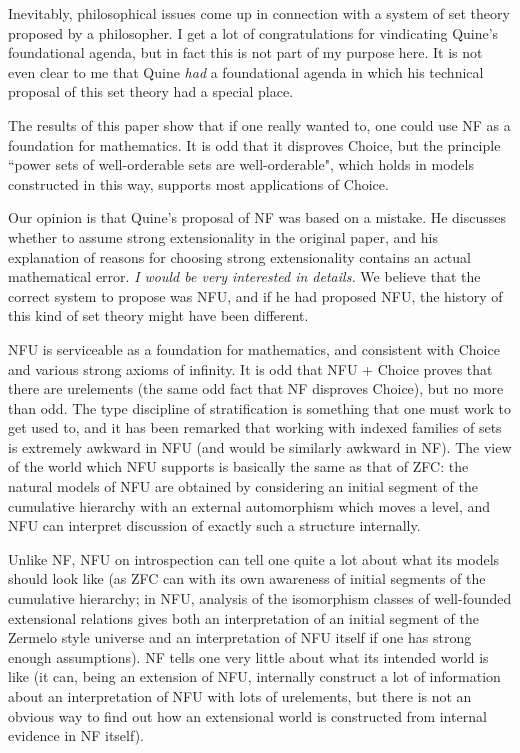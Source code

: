 \documentclass[112pt]{article}
\theoremstyle{definition}
\theoremstyle{remark}
\newcommand{\rk}[1]{{\color{blue}\sl #1}}
\newcommand{\rk}[1]{}
\begin{document}
Inevitably, philosophical issues come up in connection with a system of set theory proposed by a philosopher.  I get a lot of congratulations for vindicating Quine's foundational agenda, but in fact this is not part of my purpose here.  It is not even clear to me that Quine {\em had\/} a foundational agenda in which his technical proposal of this set theory had a special place.

The results of this paper show that if one really wanted to, one could use NF as a foundation for mathematics.  It is odd that it disproves Choice, but the principle ``power sets of well-orderable sets are well-orderable", which holds in models constructed in this way, supports most applications of Choice.

Our opinion is that Quine's proposal of NF was based on a mistake.  He discusses whether to assume strong extensionality in the original paper, and his explanation of reasons for choosing strong extensionality contains an actual mathematical error.  \rk{I would be very interested in details.}  
We believe that the correct system to propose was NFU, and if he had proposed NFU, the history of this kind of set theory might have been different.

NFU is serviceable as a foundation for mathematics, and consistent with Choice and various strong axioms of infinity.  It is odd that NFU + Choice proves that there are urelements (the same odd fact that NF disproves Choice), but no more than odd.
The type discipline of stratification is something that one must work to get used to, and it has been remarked that working with indexed families of sets is extremely awkward in NFU (and would be similarly awkward in NF).  The view of the world which NFU supports is basically the same as that of ZFC:  the natural models of NFU are obtained by considering an initial segment of the cumulative hierarchy with an external automorphism which moves a level, and NFU can interpret discussion of exactly such a structure internally.

Unlike NF, NFU on introspection can tell one quite a lot about what its models should look like (as ZFC can with its own awareness of initial segments of the cumulative hierarchy; in NFU, analysis of the isomorphism classes of well-founded extensional relations gives both an interpretation of an initial segment of the Zermelo style universe and an interpretation of NFU itself if one has strong enough assumptions).    NF tells one very little about what its intended world is like (it can, being an extension of NFU, internally construct a lot of information about an interpretation of NFU with lots of urelements, but there is not an obvious way to find out how an extensional world is constructed from internal evidence in NF itself).
\end{document}
